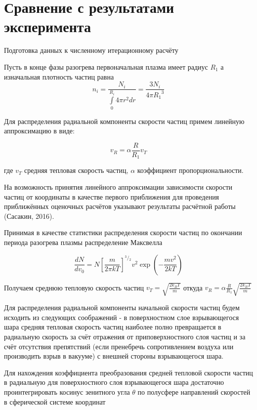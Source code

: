 ﻿\documentclass[12pt, letterpaper]{article}
\begin{document}
\section{Сравнение с результатами эксперимента}

Подготовка данных к численному итерационному расчёту

Пусть в конце фазы разогрева первоначальная плазма имеет радиус ${{R}_{1}}$ а изначальная плотность частиц равна   \[{{n}_{i}}=\frac{{{N}_{i}}}{\int\limits_{0}^{{{R}_{i}}}{4\pi {{r}^{2}}dr}}=\frac{3{{N}_{i}}}{4\pi {{R}_{1}}^{3}}\]

Для распределения радиальной компоненты скорости частиц примем линейную аппроксимацию в виде: 

	$${{v}_{R}}=\alpha \frac{R}{{{R}_{1}}}{{v}_{T}}$$
	
где ${{v}_{T}}$ средняя тепловая скорость частиц, $\alpha $ коэффициент пропорциональности.

На возможность принятия линейного аппроксимации зависимости скорости частиц от координаты в качестве первого приближения для проведения приближённых оценочных расчётов указывают результаты расчётной работы (Сасакин, 2016).

Принимая в качестве статистики распределения скорости частиц по окончании периода разогрева плазмы распределение Максвелла 

	\[\frac{dN}{d{{v}_{0}}}=N{{\left[ \frac{m}{2\pi kT} \right]}^{{}^{3}/{}_{2}}}{{v}^{2}}\exp \left( -\frac{m{{v}^{2}}}{2kT} \right)\]


Получаем  среднюю тепловую скорость частиц  ${{v}_{T}}=\sqrt{\frac{2{{k}_{B}}T}{m}}$ откуда
	${{v}_{R}}=\alpha \frac{R}{{{R}_{1}}}\sqrt{\frac{2{{k}_{B}}T}{m}}$

Для распределения радиальной компоненты начальной скорости частиц будем исходить из следующих соображений - в поверхностном слое взрывающегося шара средняя тепловая скорость частиц наиболее полно превращается в радиальную скорость за счёт отражения от приповерхностного слоя частиц и за счёт отсутствия препятствий (если пренебречь сопротивлением воздуха или производить взрыв в вакууме) с внешней стороны взрывающегося шара.

Для нахождения коэффициента преобразования средней тепловой скорости частиц в радиальную для поверхностного слоя взрывающегося шара достаточно проинтегрировать косинус зенитного угла $\theta$ по полусфере направлений скоростей в сферической системе координат

\end{document}
